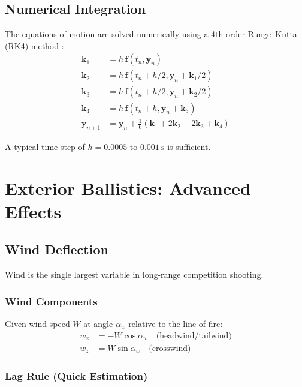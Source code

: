 \documentclass[11pt,twoside,openright]{report}
\begin{document}
\section{Numerical Integration}

The equations of motion are solved numerically using a 4th-order Runge--Kutta (RK4) method \citep{press2007numerical}:
\begin{align}
  \bm{k}_1 &= h\,\bm{f}(t_n, \bm{y}_n) \\
  \bm{k}_2 &= h\,\bm{f}(t_n + h/2, \bm{y}_n + \bm{k}_1/2) \\
  \bm{k}_3 &= h\,\bm{f}(t_n + h/2, \bm{y}_n + \bm{k}_2/2) \\
  \bm{k}_4 &= h\,\bm{f}(t_n + h, \bm{y}_n + \bm{k}_3) \\
  \bm{y}_{n+1} &= \bm{y}_n + \tfrac{1}{6}(\bm{k}_1 + 2\bm{k}_2 + 2\bm{k}_3 + \bm{k}_4)
  \label{eq:rk4}
\end{align}

A typical time step of $h = 0.0005$ to $\SI{0.001}{\second}$ is sufficient.


\chapter{Exterior Ballistics: Advanced Effects}
\label{ch:advanced}

\section{Wind Deflection}
\label{sec:wind}

Wind is the single largest variable in long-range competition shooting.

\subsection{Wind Components}

Given wind speed $W$ at angle $\alpha_w$ relative to the line of fire:
\begin{align}
  w_x &= -W\cos\alpha_w \quad \text{(headwind/tailwind)} \label{eq:wind_x}\\
  w_z &= W\sin\alpha_w \quad \text{(crosswind)} \label{eq:wind_z}
\end{align}

\subsection{Lag Rule (Quick Estimation)}
\end{document}
